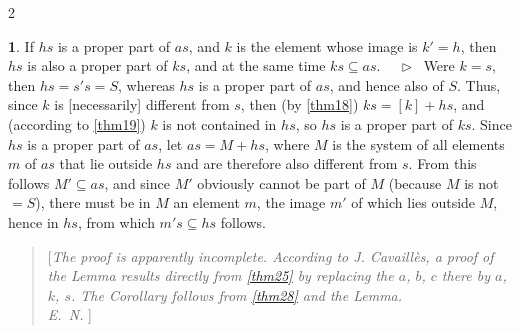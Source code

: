 \documentclass[leqno,hidelinks,10pt]{article}
\theoremstyle{definition}
\newtheorem*{hilfssatz}{\protect\hilfssatzname}
\newcommand{\hilfssatzname}{}
\renewcommand{\hilfssatzname}{Hilfssatz}%
\renewcommand{\hilfssatzname}{Lemma}%
\newcommand\Beweis{\medskip \newline $ \phantom{'.'} \rhd \ $}%
\newcommand{\partof}{\subseteq}
\newcommand{\sref}[1]{\underline{\ref{#1}}}%
\begin{document}
\begin{paracol}{2}
\begin{rightcolumn}
\begin{hilfssatz}
If $hs$ is a proper part of $as$, and $k$ is the element whose image is $k'=h$,
then $hs$ is also a proper part of $ks$, and at the same time $ks \partof as$.
\Beweis
Were $k=s$, then $hs=s's= S$, whereas $hs$ is a proper part of $as$, and hence also of $S$. Thus, since $k$ is [necessarily] different from $s$, then (by \sref{thm18}) $ks = [k]+ hs$,
and (according to \sref{thm19}) $k$ is not contained in $hs$, so $hs$ is a proper
part of $ks$. Since $hs$ is a proper part of $as$, let $as = M + hs$, where $M$
is the system of all elements $m$ of $as$ that lie outside $hs$ and are therefore
also different from $s$. From this follows $M' \partof as$, and since $M'$ obviously
cannot be part of $M$ (because $M$ is not $= S$), there must be in $M$ an element
$m$, the image $m'$ of which lies outside $M$, hence in $hs$, from which
$m's \partof hs$ follows.
\end{hilfssatz}

\begin{quote}
[\emph{The proof is apparently incomplete. According to J. Cavaillès, a proof of
the Lemma results directly from \sref{thm25} by replacing the $a$, $b$, $c$ there
by $a$, $k$, $s$. The Corollary follows from \sref{thm28} and the Lemma.
\ \\
E.~N.
}]\end{quote}



\end{rightcolumn}
\end{paracol}
\end{document}
